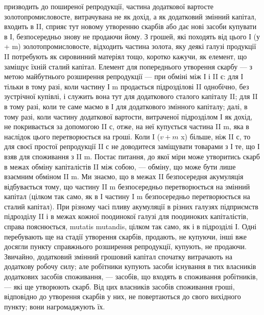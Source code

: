\parcont{}  %
призводить до поширеної репродукції, частина додаткової вартосте золотопромисловосте,
витрачувана не як дохід, а як додатковий змінний
капітал, входить в II, сприяє тут новому утворенню скарбів або дає нові
засоби купувати в І, безпосередньо знову не продаючи йому. З грошей,
які походять від цього І (у + m) золотопромисловосте, відходить частина
золота, яку деякі галузі продукції II потребують як сировинний матеріял
тощо, коротко кажучи, як елемент, що заміщує їхній сталий капітал.
Елемент для попереднього утворення скарбу — з метою майбутнього розширення
репродукції — при обміні між І і II є: для І тільки в тому разі,
коли частину І m продається підрозділові II однобічно, без зустрічної
купівлі, і служить вона тут для додаткового сталого капіталу II; для II
в тому разі, коли те саме маємо в І для додаткового змінного капіталу;
далі, в тому разі, коли частину додаткової вартости, витраченої підрозділом
І як дохід, не покривається за допомогою II с, отже, на неї купується
частина II m, яка в наслідок цього перетворюється на гроші. Коли
I ($v + m$ x) більше, ніж II с, то для своєї простої репродукції II с не
доводитеся заміщувати товарами з І те, що І взяв для споживання з II m.
Постає питання, до якої міри може утворитись скарб в межах обміну
капіталістів II між собою, — обміну, що може бути лише взаємним
обміном II m. Ми знаємо, що в межах II безпосередня акумуляція відбувається
тому, що частину II m безпосередньо перетворюється на змінний
капітал (цілком так само, як в І частину I m безпосередньо перетворюється
на сталий капітал). При різному часі пливу акумуляції в різних галузях
підприємств підрозділу II і в межах кожної поодинокої галузі для поодиноких
капіталістів, справа пояснюється, mutatis mutandis, цілком так само,
як і в підрозділі І. Одні перебувають ще на стадії утворення скарбів,
продають, не купуючи, інші вже досягли пункту справжнього розширення
репродукції, купують, не продаючи. Звичайно, додатковий змінний грошовий
капітал спочатку витрачають на додаткову робочу силу; але робітники
купують засоби існування в тих власників додаткових засобів
споживання, — засобів, що входять в споживання робітників, — які ще
утворюють скарб. Від цих власників засобів споживання гроші, відповідно
до утворення скарбів у них, не повертаються до свого вихідного
пункту; вони нагромаджують їх.
\parbreak{}  %
